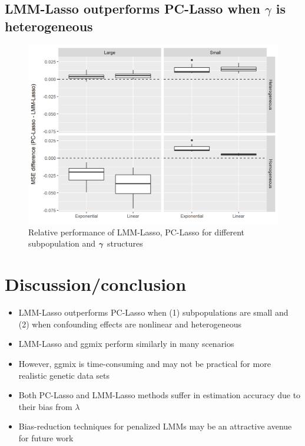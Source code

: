 \subsection{LMM-Lasso outperforms PC-Lasso when $\gamma$ is heterogeneous}
\begin{figure}[H]
    \centering
    \includegraphics[scale = 0.9]{figures/fig2b.png}
    \caption{Relative performance of LMM-Lasso, PC-Lasso for different subpopulation and $\boldsymbol{\gamma}$ structures}
    \label{fig:my_label}
\end{figure}





\section{Discussion/conclusion}
\begin{itemize}
    \item LMM-Lasso outperforms PC-Lasso when (1) subpopulations are small and (2) when confounding effects are nonlinear and heterogeneous
    \item LMM-Lasso \cite{Rakitsch2012} and ggmix  \cite{bhatnagar2019simultaneous} perform similarly in many scenarios
    \item However, ggmix is time-consuming and may not be practical for more realistic genetic data sets
    \item Both PC-Lasso and LMM-Lasso methods suffer in estimation accuracy due to their bias from $\lambda$
    \item Bias-reduction techniques for penalized LMMs may be an attractive avenue for future work
\end{itemize}
